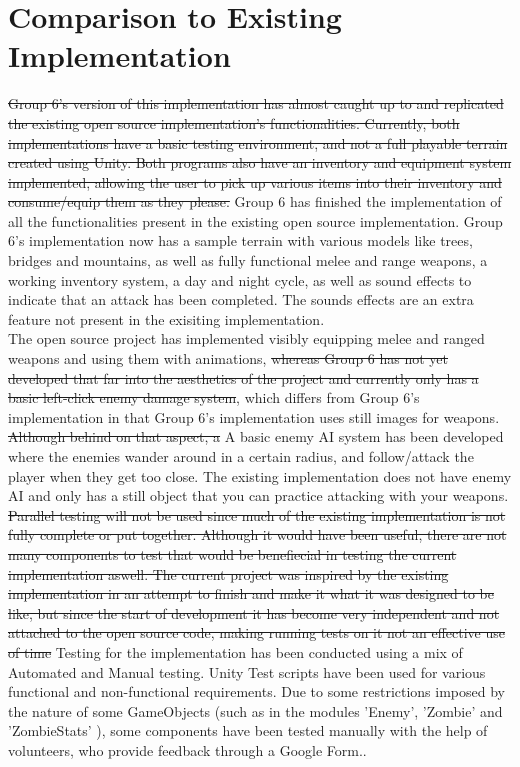 \documentclass[12pt, titlepage]{article}
\DeclareRobustCommand{\hsout}[1]{\texorpdfstring{\sout{#1}}{#1}}
\begin{document}
\section{Comparison to Existing Implementation}	

\hsout{Group 6's version of this implementation has almost caught up to and replicated the existing open source implementation's functionalities. Currently, both implementations have a basic testing environment, and not a full playable terrain created using Unity. Both programs also have an inventory and equipment system implemented, allowing the user to pick up various items into their inventory and consume/equip them as they please.}
{\color{magenta} Group 6 has finished the implementation of all the functionalities present in the existing open source implementation. Group 6's implementation now has a sample terrain with various models like trees, bridges and mountains, as well as fully functional melee and range weapons, a working inventory system, a day and night cycle, as well as sound effects to indicate that an attack has been completed. The sounds effects are an extra feature not present in the exisiting implementation.}\\

The open source project has implemented visibly equipping melee and ranged weapons and using them with animations, \hsout{whereas Group 6 has not yet developed that far into the aesthetics of the project and currently only has a basic left-click enemy damage system}, {\color{magenta}which differs from Group 6's implementation in that Group 6's implementation uses still images for weapons.} \hsout{Although behind on that aspect, a} {\color{magenta}A } basic enemy AI system has been developed where the enemies wander around in a certain radius, and follow/attack the player when they get too close.  The existing implementation does not have enemy AI and only has a still object that you can practice attacking with your weapons. \\

\hsout{Parallel testing will not be used since much of the existing implementation is not fully complete or put together. Although it would have been useful, there are not many components to test that would be benefiecial in testing the current implementation aswell. The current project was inspired by the existing implementation in an attempt to finish and make it what it was designed to be like, but since the start of development it has become very independent and not attached to the open source code, making running tests on it not an effective use of time}
{\color{magenta} Testing for the implementation has been conducted using a mix of Automated and Manual testing. Unity Test scripts have been used for various functional and non-functional requirements. Due to some restrictions imposed by the nature of some GameObjects (such as in the modules 'Enemy', 'Zombie' and 'ZombieStats' ), some components have been tested manually with the help of volunteers, who provide feedback through a Google Form.}.
\end{document}
